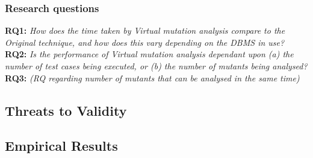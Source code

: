\subsubsection{Research questions}

\textbf{RQ1: }\emph{How does the time taken by Virtual mutation analysis compare to the Original technique, and how does
this vary depending on the DBMS in use?}\\

\textbf{RQ2: }\emph{Is the performance of Virtual mutation analysis dependant upon (a) the number of test cases being
executed, or (b) the number of mutants being analysed?}\\

\textbf{RQ3: }\emph{(RQ regarding number of mutants that can be analysed in the same time)}\\

\subsection{Threats to Validity}

\subsection{Empirical Results}



